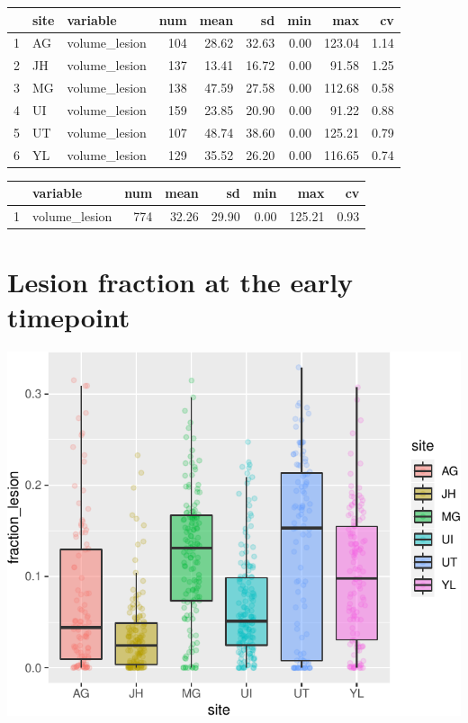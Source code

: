 \documentclass[
]{article}
\begin{document}
\begin{table}[ht]
\centering
\begin{tabular}{rllrrrrrr}
  \hline
 & site & variable & num & mean & sd & min & max & cv \\ 
  \hline
1 & AG & volume\_lesion & 104 & 28.62 & 32.63 & 0.00 & 123.04 & 1.14 \\ 
  2 & JH & volume\_lesion & 137 & 13.41 & 16.72 & 0.00 & 91.58 & 1.25 \\ 
  3 & MG & volume\_lesion & 138 & 47.59 & 27.58 & 0.00 & 112.68 & 0.58 \\ 
  4 & UI & volume\_lesion & 159 & 23.85 & 20.90 & 0.00 & 91.22 & 0.88 \\ 
  5 & UT & volume\_lesion & 107 & 48.74 & 38.60 & 0.00 & 125.21 & 0.79 \\ 
  6 & YL & volume\_lesion & 129 & 35.52 & 26.20 & 0.00 & 116.65 & 0.74 \\ 
   \hline
\end{tabular}
\end{table}
\begin{table}[ht]
\centering
\begin{tabular}{rlrrrrrr}
  \hline
 & variable & num & mean & sd & min & max & cv \\ 
  \hline
1 & volume\_lesion & 774 & 32.26 & 29.90 & 0.00 & 125.21 & 0.93 \\ 
   \hline
\end{tabular}
\end{table}

\hypertarget{lesion-fraction-at-the-early-timepoint}{%
\section{Lesion fraction at the early
timepoint}\label{lesion-fraction-at-the-early-timepoint}}

\begin{center}\includegraphics{paper_files/figure-latex/plot_fraction_lesion_early-1} \end{center}
\end{document}
